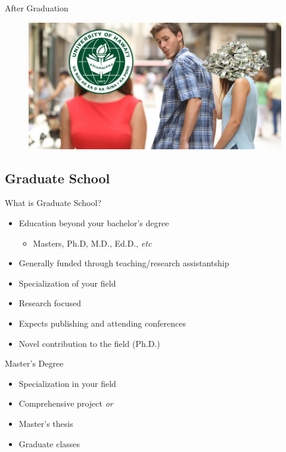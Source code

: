 \documentclass{beamer}
\begin{document}
\begin{frame}{After Graduation}
\begin{figure}
	\includegraphics[width=\linewidth]{img/uh.png}
\end{figure}
\end{frame}

\subsection{Graduate School}

\begin{frame}{What is Graduate School?}
\begin{itemize}
	\item Education beyond your bachelor's degree
	\begin{itemize}
		\item Masters, Ph.D, M.D., Ed.D., \emph{etc}
	\end{itemize}
	\item Generally funded through teaching/research assistantship
	\item Specialization of your field
	\item Research focused
	\item Expects publishing and attending conferences
	\item Novel contribution to the field (Ph.D.)
\end{itemize}
\end{frame}

\begin{frame}{Master's Degree}
	\begin{itemize}
		\item Specialization in your field
		\item Comprehensive project \emph{or}
		\item Master's thesis
		\item Graduate classes
	\end{itemize}
\end{frame}
\end{document}
